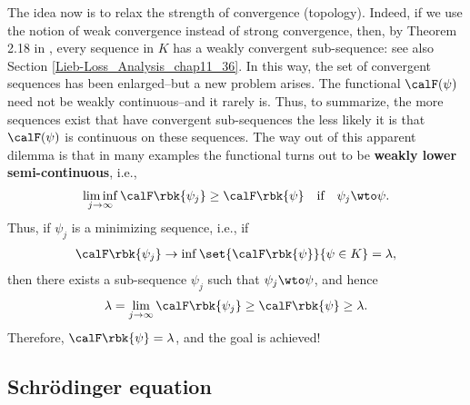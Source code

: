 \documentclass[openany, a4paper, oneside]{jsbook}
\begin{document}
The idea now is to relax the strength of convergence (topology).
Indeed, if we use the notion of weak convergence instead of strong convergence, then, by Theorem 2.18 in \cite{LiebLoss1},
every sequence in $K$ has a weakly convergent sub-sequence: see also Section \ref{Lieb-Loss_Analysis_chap11_36}.
In this way, the set of convergent sequences has been enlarged--but a new problem arises.
The functional $\calF (\psi)$ need not be weakly continuous--and it rarely is.
Thus, to summarize, the more sequences exist that have convergent sub-sequences the less likely it is that
$\calF (\psi)$ is continuous on these sequences.
The way out of this apparent dilemma is that in many examples the functional turns out to be \textbf{weakly lower semi-continuous}, i.e.,
\begin{align}
 \liminf_{j \to \infty} \calF \rbk{\psi_j} \geq \calF \rbk{\psi}
 \quad \text{if} \quad \psi_j \wto \psi.
\end{align}
Thus, if $\psi_j$ is a minimizing sequence, i.e., if
\begin{align}
 \calF \rbk{\psi_j} \to \inf \set{\calF \rbk{\psi}}{\psi \in K} = \lambda,
\end{align}
then there exists a sub-sequence $\psi_j$ such that $\psi_j \wto \psi$, and hence
\begin{align}
 \lambda
 =
 \lim_{j \to \infty} \calF \rbk{\psi_j} \geq \calF \rbk{\psi} \geq \lambda.
\end{align}
Therefore, $\calF \rbk{\psi} = \lambda$, and the goal is achieved!
\subsection{Schr\"odinger equation}
\end{document}
